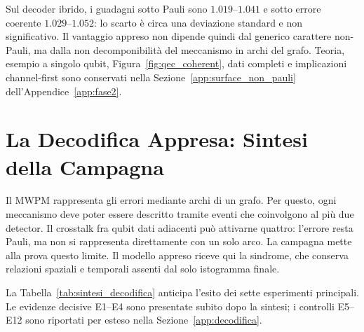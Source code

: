 \begin{onehalfspace}
Sul decoder ibrido, i guadagni sotto Pauli sono $1.019$--$1.041$ e sotto
errore coerente $1.029$--$1.052$: lo scarto è circa una deviazione
standard e non significativo. Il vantaggio appreso non dipende quindi dal
generico carattere non-Pauli, ma dalla non decomponibilità del meccanismo
in archi del grafo. Teoria, esempio a singolo qubit, Figura~\ref{fig:qec_coherent},
dati completi e implicazioni channel-first sono conservati nella
Sezione~\ref{app:surface_non_pauli} dell'Appendice~\ref{app:fase2}.

\section{La Decodifica Appresa: Sintesi della Campagna}
\label{sec:decodifica_appresa}

Il \ac{MWPM} rappresenta gli errori mediante archi di un grafo. Per questo, ogni meccanismo deve poter essere descritto tramite eventi che coinvolgono al più due detector. Il crosstalk fra qubit dati adiacenti può attivarne quattro: l'errore resta Pauli, ma non si rappresenta direttamente con un solo arco. La campagna mette alla prova questo limite. Il modello appreso riceve qui la sindrome, che conserva relazioni spaziali e temporali assenti dal solo istogramma finale.

La Tabella~\ref{tab:sintesi_decodifica} anticipa l'esito dei sette
esperimenti principali. Le evidenze decisive E1--E4 sono presentate subito
dopo la sintesi; i controlli E5--E12 sono riportati per esteso nella
Sezione~\ref{app:decodifica}.


\end{onehalfspace}
